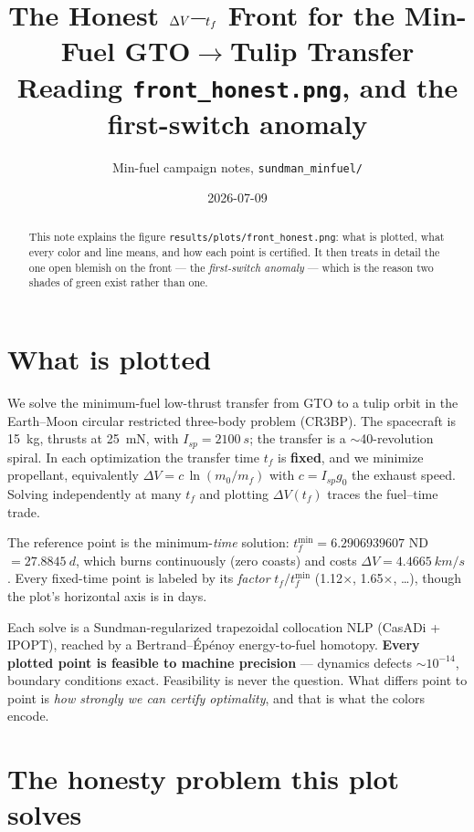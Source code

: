 \documentclass[11pt]{article}
\title{The Honest $\dV$--$\tf$ Front for the Min-Fuel GTO$\to$Tulip Transfer\\
\large Reading \texttt{front\_honest.png}, and the first-switch anomaly}
\author{Min-fuel campaign notes, \texttt{sundman\_minfuel/}}
\date{2026-07-09}
\newcommand{\dV}{\Delta V}
\newcommand{\tf}{t_f}
\begin{document}
\maketitle

\begin{abstract}
\noindent
This note explains the figure \texttt{results/plots/front\_honest.png}: what is
plotted, what every color and line means, and how each point is certified. It
then treats in detail the one open blemish on the front --- the \emph{first-switch
anomaly} --- which is the reason two shades of green exist rather than one.
\end{abstract}

\section{What is plotted}

We solve the minimum-fuel low-thrust transfer from GTO to a tulip orbit in the
Earth--Moon circular restricted three-body problem (CR3BP). The spacecraft is
\SI{15}{kg}, thrusts at \SI{25}{mN}, with $I_{sp}=\SI{2100}{s}$; the transfer is
a $\sim$40-revolution spiral. In each optimization the transfer time $\tf$ is
\textbf{fixed}, and we minimize propellant, equivalently
$\dV = c\,\ln(m_0/m_f)$ with $c=I_{sp}g_0$ the exhaust speed. Solving
independently at many $\tf$ and plotting $\dV(\tf)$ traces the fuel--time trade.

The reference point is the minimum-\emph{time} solution: $\tf^{\min}=
6.2906939607$ ND $=\SI{27.8845}{d}$, which burns continuously (zero coasts) and
costs $\dV=\SI{4.4665}{km/s}$. Every fixed-time point is labeled by its
\emph{factor} $\tf/\tf^{\min}$ (1.12$\times$, 1.65$\times$, \dots), though the
plot's horizontal axis is in days.

Each solve is a Sundman-regularized trapezoidal collocation NLP (CasADi +
IPOPT), reached by a Bertrand--\'Ep\'enoy energy-to-fuel homotopy. \textbf{Every
plotted point is feasible to machine precision} --- dynamics defects
$\sim\!10^{-14}$, boundary conditions exact. Feasibility is never the question.
What differs point to point is \emph{how strongly we can certify optimality},
and that is what the colors encode.

\section{The honesty problem this plot solves}
\end{document}
